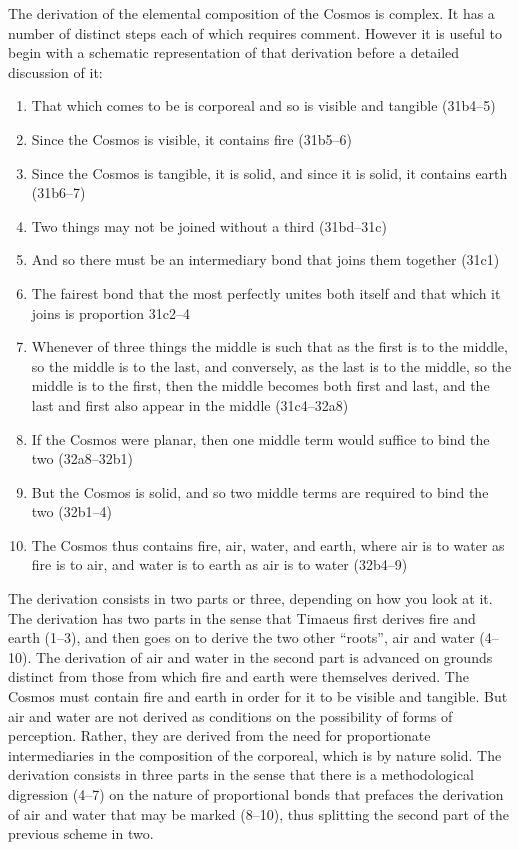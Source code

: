 The derivation of the elemental composition of the Cosmos is complex. It has a number of distinct steps each of which requires comment. However it is useful to begin with a schematic representation of that derivation before a detailed discussion of it:
\begin{enumerate}[(1)]
	\item That which comes to be is corporeal and so is visible and tangible (31b4--5)
	\item Since the Cosmos is visible, it contains fire (31b5--6)
	\item Since the Cosmos is tangible, it is solid, and since it is solid, it contains earth (31b6--7)
	\item Two things may not be joined without a third (31bd--31c)
	\item And so there must be an intermediary bond that joins them together (31c1)
	\item The fairest bond that the most perfectly unites both itself and that which it joins is proportion 31c2--4
	\item Whenever of three things the middle is such that as the first is to the middle, so the middle is to the last, and conversely, as the last is to the middle, so the middle is to the first, then the middle becomes both first and last, and the last and first also appear in the middle (31c4--32a8)
	\item If the Cosmos were planar, then one middle term would suffice to bind the two (32a8--32b1)
	\item But the Cosmos is solid, and so two middle terms are required to bind the two (32b1--4)
	\item The Cosmos thus contains fire, air, water, and earth, where air is to water as fire is to air, and water is to earth as air is to water (32b4--9)
\end{enumerate}
The derivation consists in two parts or three, depending on how you look at it. The derivation has two parts in the sense that Timaeus first derives fire and earth (1--3), and then goes on to derive the two other ``roots'', air and water (4--10). The derivation of air and water in the second part is advanced on grounds distinct from those from which fire and earth were themselves derived. The Cosmos must contain fire and earth in order for it to be visible and tangible. But air and water are not derived as conditions on the possibility of forms of perception. Rather, they are derived from the need for proportionate intermediaries in the composition of the corporeal, which is by nature solid. The derivation consists in three parts in the sense that there is a methodological digression (4--7) on the nature of proportional bonds that prefaces the derivation of air and water that may be marked (8--10), thus splitting the second part of the previous scheme in two.


